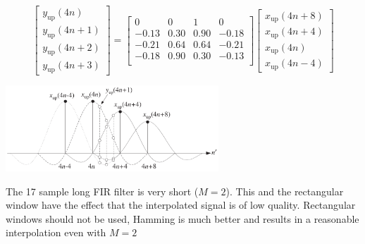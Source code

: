 \begin{equation*}
  \begin{bmatrix}
    y_{\text{up}}(4n) \\
    y_{\text{up}}(4n+1) \\
    y_{\text{up}}(4n+2) \\
    y_{\text{up}}(4n+3)
  \end{bmatrix}
  =
  \begin{bmatrix}
        0 &    0 &    1 &     0 \\
    -0.13 & 0.30 & 0.90 & -0.18 \\
    -0.21 & 0.64 & 0.64 & -0.21 \\
    -0.18 & 0.90 & 0.30 & -0.13 \\
  \end{bmatrix}
  \begin{bmatrix}
    x_{\text{up}}(4n+8) \\
    x_{\text{up}}(4n+4) \\
    x_{\text{up}}(4n) \\
    x_{\text{up}}(4n-4)
  \end{bmatrix}
\end{equation*}
\begin{center}
  \includegraphics[width=8cm]{images/IntDecOv_DesignExampleSuperposition.png}
\end{center}

The 17 sample long FIR filter is very short ($M=2$).
This and the rectangular window have the effect that the interpolated signal is of low quality.
Rectangular windows should not be used, Hamming is much better and results in a reasonable interpolation even with $M=2$

